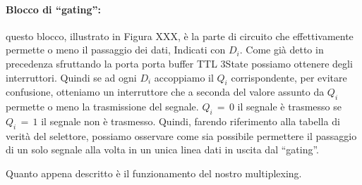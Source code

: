\paragraph*{Blocco di ``gating'':}
questo blocco, illustrato in Figura XXX, è la parte di circuito che effettivamente permette o meno il passaggio dei dati, Indicati con $D_i$. Come già detto in precedenza sfruttando la porta porta buffer TTL 3State possiamo ottenere degli interruttori. Quindi se ad ogni $D_i$ accoppiamo il $Q_i$ corrispondente, per evitare confusione, otteniamo un interruttore che a seconda del valore assunto da $Q_i$ permette o meno la trasmissione del segnale. $Q_i\,=\,0$ il segnale è trasmesso se $Q_i\,=\,1$ il segnale non è trasmesso. Quindi, farendo riferimento alla tabella di verità del selettore, possiamo osservare come sia possibile permettere il passaggio di un solo segnale alla volta in un unica linea dati in uscita dal ``gating''.

Quanto appena descritto è il funzionamento del nostro multiplexing.


















